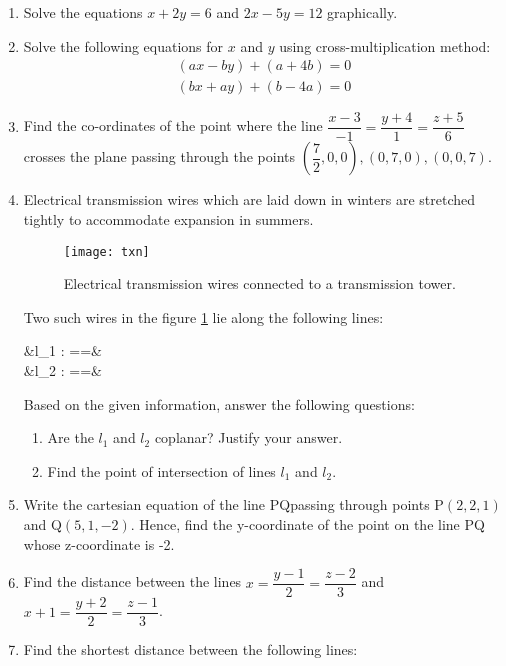 %
\begin{enumerate}
\item Solve the equations $x+2y=6$ and $2x-5y=12$ graphically.	
\item Solve the following equations for $x$ and $y$ using cross-multiplication method:
	\begin{align*}
		(ax-by)+(a+4b)=0\\(bx+ay)+(b-4a)=0
	\end{align*}
\item Find the co-ordinates of the point where the line $\dfrac{x-3}{-1}=\dfrac{y+4}{1}=\dfrac{z+5}{6}$ crosses the plane passing through the points $\left(\dfrac{7}{2},0,0\right),(0,7,0),(0,0,7)$.
\item Electrical transmission wires which are laid down in winters are stretched tightly to accommodate expansion in summers.
	\begin{figure}[H]
		\centering
		\texttt{[image: txn]}
		\caption{Electrical transmission wires connected to a transmission tower.}
		\label{fig:txn1}
	\end{figure}
		Two such wires in the figure \ref{fig:txn1} lie along the following lines:\\
		\begin{flalign*}
			&l_1 : ==&\\
			 &l_2 : ==&
		\end{flalign*}
	Based on the given information, answer the following questions:	\begin{enumerate}
		\item	Are the $l_1$ and $l_2$ coplanar? Justify your answer.
				\item    Find the point of intersection of lines $l_1$ and $l_2$.
			\end{enumerate}
     \item Write the cartesian equation of the line PQ\@ passing through points P$(2,2,1)$ and Q$(5,1,-2)$. Hence, find the y-coordinate of the point on the line PQ whose z-coordinate is -2.
			\item Find the distance between the lines $x=\dfrac{y-1}{2}=\dfrac{z-2}{3}$ and $x+1=\dfrac{y+2}{2}=\dfrac{z-1}{3}$.
\item Find the shortest distance between the following lines:
	\begin{flalign*}

\end{flalign*}
\end{enumerate}
